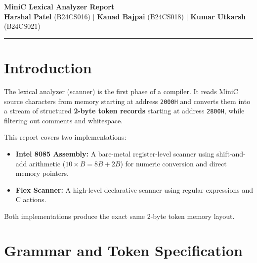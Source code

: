 \documentclass[11pt,a4paper]{article}
\begin{document}

\begin{center}
    {\LARGE \textbf{MiniC Lexical Analyzer Report}}\\[0.5em]
    {\normalsize \textbf{Harshal Patel} (B24CS016) \quad$\vert$\quad
    \textbf{Kanad Bajpai} (B24CS018) \quad$\vert$\quad
    \textbf{Kumar Utkarsh} (B24CS021)}
\end{center}

\vspace{0.2em}
\hrule
\vspace{1.0em}

\section{Introduction}
The lexical analyzer (scanner) is the first phase of a compiler. It reads MiniC source characters from memory starting at address \texttt{2000H} and converts them into a stream of structured \textbf{2-byte token records} starting at address \texttt{2800H}, while filtering out comments and whitespace.

This report covers two implementations:
\begin{itemize}[itemsep=2pt, topsep=2pt]
    \item \textbf{Intel 8085 Assembly:} A bare-metal register-level scanner using shift-and-add arithmetic ($10 \times B = 8B + 2B$) for numeric conversion and direct memory pointers.
    \item \textbf{Flex Scanner:} A high-level declarative scanner using regular expressions and C actions.
\end{itemize}
Both implementations produce the exact same 2-byte token memory layout.

\section{Grammar and Token Specification}
\end{document}
